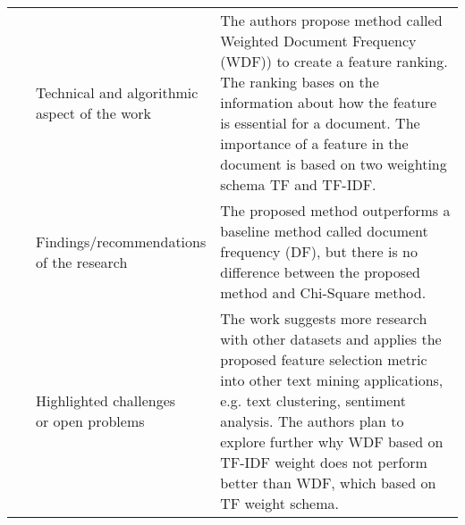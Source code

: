 \begin{landscape}
\begin{longtable}{lp{}p{}}
    \multirow{3}[10]{*}{~\citep{Li2015}} & 
    \specialcell{Technical and algorithmic \\ aspect of the work} & 
    The authors propose method called Weighted Document Frequency (WDF)) to create a feature ranking. The ranking bases on the information about how the feature is essential for a document. The importance of a feature in the document is based on two weighting schema TF and TF-IDF.   
    \\ & 
    \specialcell{Findings/recommendations \\ of the research} & 
	The proposed method outperforms a baseline method called document frequency (DF), but there is no difference between the proposed method and Chi-Square method.  	
	\\ & 
	\specialcell{Highlighted challenges \\ or open problems} & 
	The work suggests more research with other datasets and applies the proposed feature selection metric into other text mining applications, e.g. text clustering, sentiment analysis. The authors plan to explore further why WDF based on TF-IDF weight does not perform better than WDF, which based on TF weight schema. 
	\\
    	

\end{longtable}
\end{landscape}
